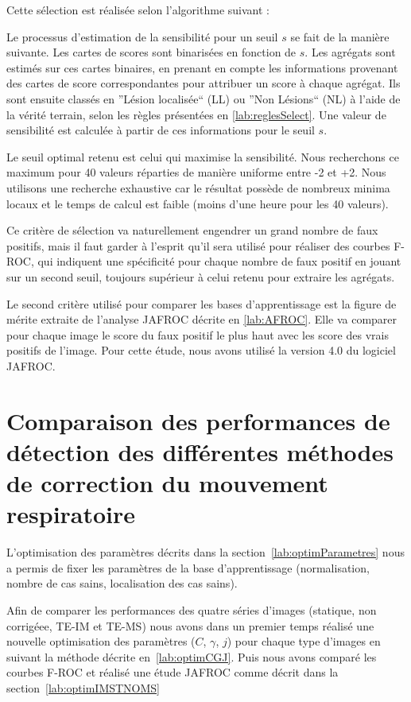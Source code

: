 Cette sélection est réalisée selon l'algorithme suivant :

Le processus d'estimation de la sensibilité pour un seuil $s$ se fait de la manière suivante. Les cartes de scores sont binarisées en fonction de $s$. Les agrégats sont estimés sur ces cartes binaires, en prenant en compte les informations provenant des cartes de score correspondantes pour attribuer un score à chaque agrégat. Ils sont ensuite classés en ''Lésion localisée`` (LL) ou ''Non Lésions`` (NL) à l'aide de la vérité terrain, selon les règles présentées en \ref{lab:reglesSelect}. Une valeur de sensibilité est calculée à partir de ces informations pour le seuil $s$.

Le seuil optimal retenu est celui qui maximise la sensibilité. Nous recherchons ce maximum pour 40 valeurs réparties de manière uniforme entre -2 et +2. Nous utilisons une recherche exhaustive car le résultat possède de nombreux minima locaux et le temps de calcul est faible (moins d'une heure pour les 40 valeurs).

Ce critère de sélection va naturellement engendrer un grand nombre de faux positifs, mais il faut garder à l'esprit qu'il sera utilisé pour réaliser des courbes F-ROC, qui indiquent une spécificité pour chaque nombre de faux positif en jouant sur un second seuil, toujours supérieur à celui retenu pour extraire les agrégats.

Le second critère utilisé pour comparer les bases d'apprentissage est la figure de mérite extraite de l'analyse JAFROC décrite en \ref{lab:AFROC}. Elle va comparer pour chaque image le score du faux positif le plus haut avec les score des vrais positifs de l'image. Pour cette étude, nous avons utilisé la version 4.0 du logiciel JAFROC.

\section{Comparaison des performances de détection des différentes méthodes de correction du mouvement respiratoire}

L'optimisation des paramètres décrits dans la section~\ref{lab:optimParametres} nous a permis de fixer les paramètres de la base d'apprentissage (normalisation, nombre de cas sains, localisation des cas sains).

Afin de comparer les performances des quatre séries d'images (statique, non corrigéee, TE-IM et TE-MS) nous avons dans un premier temps réalisé une nouvelle optimisation des paramètres ($C$, $\gamma$, $j$) pour chaque type d'images en suivant la méthode décrite en~\ref{lab:optimCGJ}. Puis nous avons comparé les courbes F-ROC et réalisé une étude JAFROC comme décrit dans la section~\ref{lab:optimIMSTNOMS}




